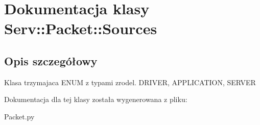 \hypertarget{class_serv_1_1_packet_1_1_sources}{
\section{Dokumentacja klasy Serv::Packet::Sources}
\label{class_serv_1_1_packet_1_1_sources}
}


\subsection{Opis szczegółowy}
\begin{DoxyVerb}Klasa trzymajaca ENUM z typami zrodel.
DRIVER, APPLICATION, SERVER
\end{DoxyVerb}
 

Dokumentacja dla tej klasy została wygenerowana z pliku:\begin{DoxyCompactItemize}
\item 
Packet.py\end{DoxyCompactItemize}

